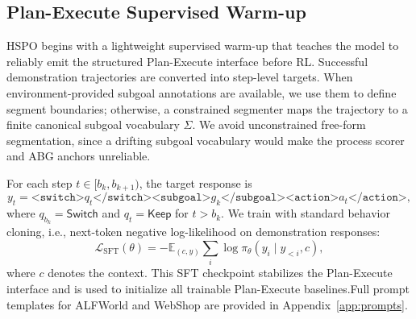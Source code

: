 \documentclass{article}
\newcommand{\wei}[1]{\textcolor{red}{#1}}
\begin{document}


\subsection{Plan-Execute Supervised Warm-up} %

HSPO begins with a lightweight supervised warm-up that teaches the model to reliably emit the structured Plan-Execute interface before RL. Successful demonstration trajectories are converted into step-level targets. When environment-provided subgoal annotations are available, we use them to define segment boundaries; otherwise, a constrained segmenter maps the trajectory to a finite canonical subgoal vocabulary $\Sigma$. We avoid unconstrained free-form segmentation, since a drifting subgoal vocabulary would make the process scorer and ABG anchors unreliable.

For each step $t\in[b_k,b_{k+1})$, the target response is
\begin{equation}
y_t =
\texttt{<switch>}q_t\texttt{</switch>}
\texttt{<subgoal>}g_k\texttt{</subgoal>}
\texttt{<action>}a_t\texttt{</action>},
\end{equation}
where $q_{b_k}=\mathsf{Switch}$ and $q_t=\mathsf{Keep}$ for $t>b_k$. We train with standard behavior cloning, i.e., next-token negative log-likelihood on demonstration responses:
\begin{equation}
\mathcal{L}_{\mathrm{SFT}}(\theta)
=
-\mathbb{E}_{(c,y)}
\sum_i
\log \pi_\theta(y_i\mid y_{<i},c),
\label{eq:sft_loss}
\end{equation}
where $c$ denotes the context. This SFT checkpoint stabilizes the Plan-Execute interface and is used to initialize all trainable Plan-Execute baselines.Full prompt templates for ALFWorld and WebShop are provided in Appendix~\ref{app:prompts}.
\end{document}
